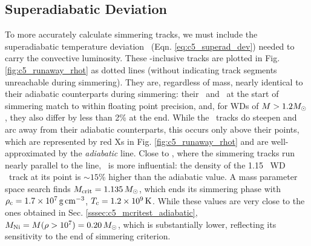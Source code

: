 
\subsection{Superadiabatic Deviation \dnabconv}
\label{ssec:c5_runaway_superad}

To more accurately calculate simmering tracks, we must include the superadiabatic temperature deviation \dnabconv\ (Eqn. \ref{eq:c5_superad_dev}) needed to carry the convective luminosity.  These \dnabconv-inclusive tracks are plotted in Fig. \ref{fig:c5_runaway_rhot} as dotted lines (without indicating track segments unreachable during simmering).  They are, regardless of mass, nearly identical to their adiabatic counterparts during simmering: their \rhoc\ and \Tc\ at the start of simmering match to within floating point precision, and, for WDs of $M > 1.2\Msun$, they also differ by less than 2\% at the end.  While the \dnabconv\ tracks do steepen and arc away from their adiabatic counterparts, this occurs only above their \citeal{wooswk04} points, which are represented by red Xs in Fig. \ref{fig:c5_runaway_rhot} and are well-approximated by the \textit{adiabatic} \citeal{wooswk04} line.  Close to \Mcrit, where the simmering tracks run nearly parallel to the \citeal{wooswk04} line, \dnabconv\ is more influential: the density of the 1.15 \Msun\ WD \dnabconv\ track at its \citeal{wooswk04} point is $\sim15$\% higher than the adiabatic value.  A mass parameter space search finds $\Mcrit=1.135\,\Msun$, which ends its simmering phase with $\rhoc = 1.7\times10^7\,\gcc$, $\Tc = 1.2\times10^9\,\mrm{K}$.  While these values are very close to the ones obtained in Sec. \ref{sssec:c5_mcritest_adiabatic}, $\MNi = M(\rho>10^7) = 0.20\,\Msun$, which is substantially lower, reflecting its sensitivity to the end of simmering criterion.


